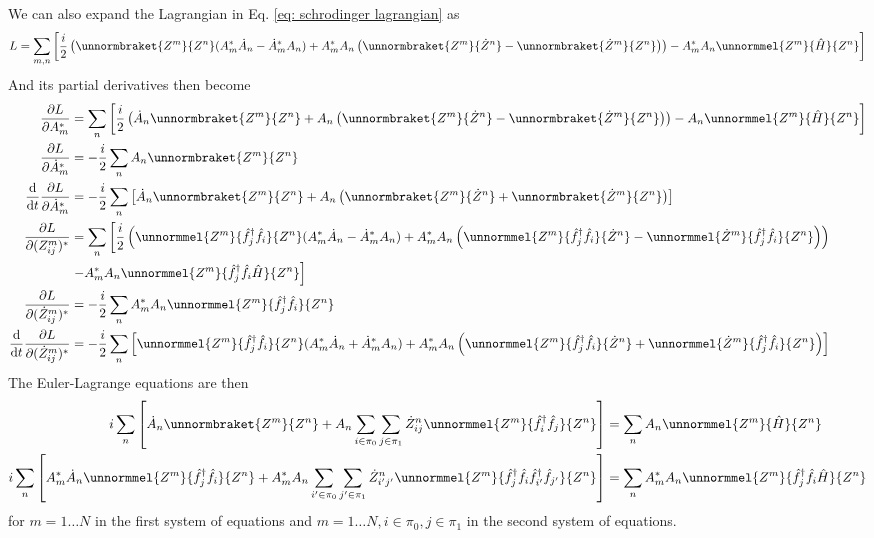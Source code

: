 \documentclass[12pt]{article}
\newcommand{\hc}{^\dagger}
\begin{document}
	We can also expand the Lagrangian in Eq. \ref{eq: schrodinger lagrangian} as
	\begin{equation} \label{eq: expanded schrodinger lagrangian}
	L=\sum_{m,n}\left[ \frac{i}{2} \left( \unnormbraket{Z^m}{Z^n}(A^*_m\dot{A}_n-\dot{A}^*_mA_n) + A_m^* A_n\left( \unnormbraket{Z^m}{\dot{Z}^n} - \unnormbraket{\dot{Z}^m}{Z^n} \right) \right) - A_m^* A_n \unnormmel{Z^m}{\hat{H}}{Z^n} \right]
	\end{equation}
	And its partial derivatives then become
	\begin{align}
	\pdv{L}{A_m^*}&=\sum_n\left[ \frac{i}{2}\left( \dot{A}_n\unnormbraket{Z^m}{Z^n} + A_n\left( \unnormbraket{Z^m}{\dot{Z}^n} - \unnormbraket{\dot{Z}^m}{Z^n} \right) \right) - A_n \unnormmel{Z^m}{\hat{H}}{Z^n} \right]\\
	\pdv{L}{\dot{A}_m^*}&=-\frac{i}{2}\sum_n A_n\unnormbraket{Z^m}{Z^n}\\
	\dv{t}\pdv{L}{\dot{A}_m^*}&=-\frac{i}{2}\sum_{n} \left[ \dot{A}_n\unnormbraket{Z^m}{Z^n} + A_n\left( \unnormbraket{Z^m}{\dot{Z}^n} + \unnormbraket{\dot{Z}^m}{Z^n} \right) \right]\\
	\pdv{L}{(Z^m_{ij})^*}&=\sum_n\left[ \frac{i}{2} \left( \unnormmel{Z^m}{\hat{f}\hc_j \hat{f}_i}{Z^n} (A^*_m\dot{A}_n-\dot{A}^*_mA_n) + A_m^* A_n \left( \unnormmel{Z^m}{\hat{f}\hc_j \hat{f}_i}{\dot{Z}^n} - \unnormmel{\dot{Z}^m}{\hat{f}\hc_j \hat{f}_i}{Z^n} \right) \right)\nonumber\right.\\
	&\left. - A_m^* A_n \unnormmel{Z^m}{\hat{f}\hc_j \hat{f}_i \hat{H}}{Z^n} \right]\\
	\pdv{L}{(\dot{Z}^m_{ij})^*} &= -\frac{i}{2}\sum_n A_m^* A_n \unnormmel{Z^m}{\hat{f}\hc_j \hat{f}_i}{Z^n}\\
	\dv{t}\pdv{L}{(\dot{Z}^m_{ij})^*} &= -\frac{i}{2}\sum_n\left[ \unnormmel{Z^m}{\hat{f}\hc_j \hat{f}_i}{Z^n} (A^*_m\dot{A}_n+\dot{A}^*_mA_n) + A_m^* A_n \left( \unnormmel{Z^m}{\hat{f}\hc_j \hat{f}_i}{\dot{Z}^n} + \unnormmel{\dot{Z}^m}{\hat{f}\hc_j \hat{f}_i}{Z^n} \right) \right]
	\end{align}
	The Euler-Lagrange equations are then
	\begin{align}
	i\sum_n\left[ \dot{A}_n \unnormbraket{Z^m}{Z^n} + A_n \sum_{i\in\pi_0}\sum_{j\in\pi_1} \dot{Z}^n_{ij} \unnormmel{Z^m}{\hat{f}\hc_i\hat{f}_j}{Z^n} \right] &= \sum_n A_n \unnormmel{Z^m}{\hat{H}}{Z^n}\\
	i\sum_n\left[ A_m^* \dot{A}_n \unnormmel{Z^m}{\hat{f}\hc_j\hat{f}_i}{Z^n} + A_m^* A_n \sum_{i'\in\pi_0}\sum_{j'\in\pi_1} \dot{Z}^n_{i'j'} \unnormmel{Z^m}{\hat{f}\hc_j \hat{f}_i \hat{f}\hc_{i'} \hat{f}_{j'}}{Z^n} \right] &= \sum_n A_m^* A_n \unnormmel{Z^m}{\hat{f}\hc_j \hat{f}_i \hat{H}}{Z^n}
	\end{align}
	for $m=1\dots N$ in the first system of equations and $m=1\dots N, i\in\pi_0, j\in\pi_1$ in the second system of equations.
	
\end{document}
